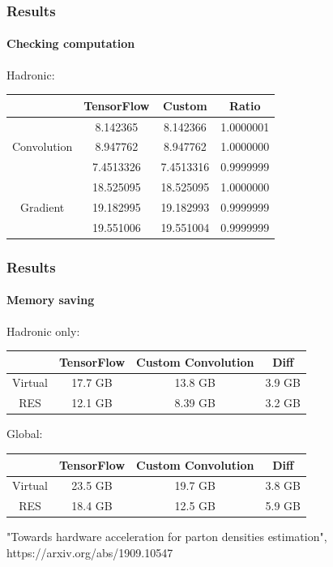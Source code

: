 \documentclass[aspectratio=43]{beamer}
\begin{document}
\begin{frame}

	\frametitle{Results}
	\framesubtitle{Checking computation}
	
	{\Large Hadronic:}
	\begin{table}
		\centering
		\begin{tabular}{c c c c}
			& TensorFlow & Custom & Ratio \\ \hline
			& 8.142365 & 8.142366 & {\color{darkgreen} 1.0000001} \\
			Convolution & 8.947762 & 8.947762 & {\color{darkgreen} 1.0000000} \\
			& 7.4513326 & 7.4513316 & {\color{darkgreen} 0.9999999} \\
			\hline
			& 18.525095 & 18.525095 & {\color{darkgreen} 1.0000000} \\
			Gradient & 19.182995 & 19.182993 & {\color{darkgreen} 0.9999999} \\
			& 19.551006 & 19.551004 & {\color{darkgreen} 0.9999999} \\
			\hline
		\end{tabular}
	\end{table}
	
\end{frame}

\begin{frame}

	\frametitle{Results}
	\framesubtitle{Memory saving}

	{\Large Hadronic only:}
	\begin{table}
		\centering
		\begin{tabular}{c c c c}
			& TensorFlow & Custom Convolution & Diff \\ \hline
			Virtual & {\color{red} 17.7 GB} & {\color{darkgreen} 13.8 GB} & {\color{darkgreen} 3.9 GB} \\
			RES & {\color{red} 12.1 GB} & {\color{darkgreen} 8.39 GB} & {\color{darkgreen} 3.2 GB} \\ \hline
		\end{tabular}
	\end{table}
	
	\hfill

	{\Large Global:}
	\begin{table}
		\centering
		\begin{tabular}{c c c c}
			& TensorFlow & Custom Convolution & Diff \\ \hline
			Virtual & {\color{red} 23.5 GB} & {\color{darkgreen} 19.7 GB} & {\color{darkgreen} 3.8 GB} \\
			RES & {\color{red} 18.4 GB} & {\color{darkgreen} 12.5 GB} & {\color{darkgreen} 5.9 GB} \\ \hline
		\end{tabular}
	\end{table}
	
	{\color{blue}"Towards hardware acceleration for parton densities estimation",\\ https://arxiv.org/abs/1909.10547}
	
\end{frame}
\end{document}
